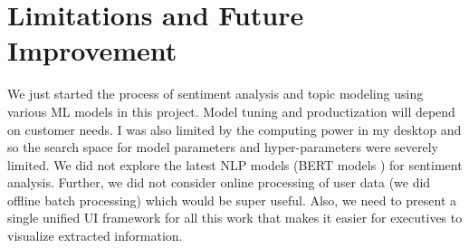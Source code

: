 \documentclass[11pt, letterpaper]{article}
\begin{document}
\section{Limitations and Future Improvement}
We just started the process of sentiment analysis and topic modeling using various ML models in this project. Model tuning and productization will depend on customer needs. I was also limited by the computing power in my desktop and so the search space for model parameters and hyper-parameters were severely limited. We did not explore the latest NLP models (BERT models \autocite{bert}) for sentiment analysis. Further, we did not consider online processing of user data (we did offline batch processing) which would be super useful. Also, we need to present a single unified UI framework for all this work that makes it easier for executives to visualize extracted information. 
\newpage
\printbibliography
\end{document}
